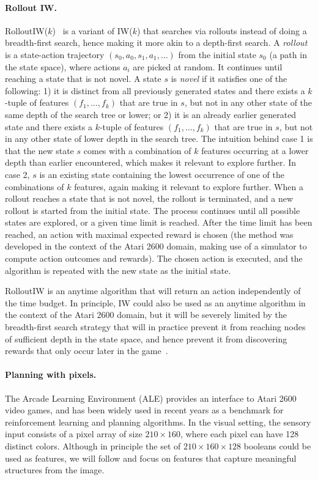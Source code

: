 \paragraph{Rollout IW.}
RolloutIW($k$)~\cite{rolloutiw-orginal} is a variant of IW($k$) that searches via rollouts instead of doing a breadth-first search, hence making it more akin to a depth-first search. A \emph{rollout} is a state-action trajectory $(s_0, a_0, s_1, a_1, \ldots)$ from the initial state $s_0$ (a path in the state space), where actions $a_i$ are picked at random. It continues until reaching a state that is not novel. A state $s$ is \emph{novel} if it satisfies one of the following: 1) it is distinct from all previously generated states and there exists a $k$-tuple of features $(f_1,\dots,f_k)$ that are true in $s$, but not in any other state of the same depth of the search tree or lower; or 2) it is an already earlier generated state and there exists a $k$-tuple of features $(f_1,\dots,f_k)$ that are true in $s$, but not in any other state of lower depth in the search tree. The intuition behind case 1 is that the new state $s$ comes with a combination of $k$ features occurring at a lower depth than earlier encountered, which makes it relevant to explore further. In case 2, $s$ is an existing state containing the lowest occurrence of one of the combinations of $k$ features, again making it relevant to explore further. When a rollout reaches a state that is not novel, the rollout is terminated, and a new rollout is started from the initial state. The process continues until all possible states are explored, or a given time limit is reached. After the time limit has been reached, an action with maximal expected reward is chosen (the method was developed in the context of the Atari 2600 domain, making use of a simulator to compute action outcomes and rewards). The chosen action is executed, and the algorithm is repeated with the new state as the initial state. 

RolloutIW is an anytime algorithm that will return an action independently of the time budget. In principle, IW could also be used as an anytime algorithm in the context of the Atari 2600 domain, but it will be severely limited by the breadth-first search strategy that will in practice prevent it from reaching nodes of sufficient depth in the state space, and hence prevent it from discovering rewards that only occur later in the game~\cite{rolloutiw-orginal}. 


\paragraph{Planning with pixels.}
The Arcade Learning Environment (ALE) \cite{DBLP:journals/corr/abs-1207-4708} provides an interface to Atari 2600 video games, and has been widely used in recent years as a benchmark for reinforcement learning and planning algorithms. In the visual setting, the sensory input consists of a pixel array of size $210\!\times\! 160$, where each pixel can have 128 distinct colors. Although in principle the set of $210\! \times\! 160\! \times\! 128$ booleans could be used as features, we will follow \citet{rolloutiw-orginal} and focus on features that capture meaningful structures from the image.

